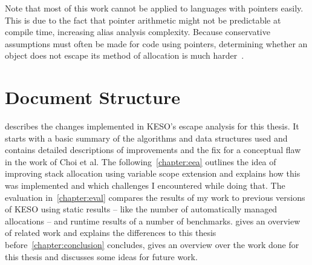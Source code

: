 		Note that most of this work cannot be applied to languages with pointers easily. This is due to the fact that
		pointer arithmetic might not be predictable at compile time, increasing alias analysis complexity. Because
		conservative assumptions must often be made for code using pointers, determining whether an object does not escape
		its method of allocation is much harder~\cite{horwitz:97:toplas, hind:99:toplas, landi:92:loplas,
		ramalingam:94:toplas}.

	\section{Document Structure}
		\label{sec:intro:document-structure}
		 describes the changes implemented in KESO's escape analysis for this thesis. It starts with
		a basic summary of the algorithms and data structures used and contains detailed descriptions of improvements and
		the fix for a conceptual flaw in the work of Choi et al. The following~\cref{chapter:eea} outlines the idea of
		improving stack allocation using variable scope extension and explains how this was implemented and which challenges
		I encountered while doing that. The evaluation in~\cref{chapter:eval} compares the results of my work to previous
		versions of KESO using static results – like the number of automatically managed allocations – and runtime results
		of a number of benchmarks.  gives an overview of related work and explains the differences to this
		thesis before~\cref{chapter:conclusion} concludes, gives an overview over the work done for this thesis and
		discusses some ideas for future work.
